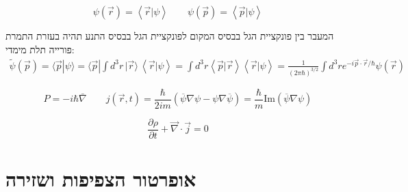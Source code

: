 \documentclass{tstextbook}
\begin{document}
\begin{definition}
$$\psi\left(\vec{r}\right)=\left\langle \vec{r}|\psi \right\rangle  \qquad \psi\left( \vec{p} \right)=\left\langle  \vec{p}|\psi  \right\rangle $$

\end{definition}
\begin{proposition}
המעבר בין פונקציית הגל בבסיס המקום לפונקציית הגל בבסיס התנע תהיה בעזרת התמרת פורייה תלת מימדי:
\begin{gather*}\widetilde{\psi}\left({\vec p}\right)=\langle {\vec p}|\psi \rangle=\langle {\vec p}|\int d^{3}r\,|{\vec r} \rangle\,\left\langle {\vec r}|\psi \right\rangle =\int d^{3}r\left\langle\vec{p}|\vec{r}\right\rangle\left\langle\vec{r}|\psi\right\rangle={\frac{1}{(2\pi\hbar)^{3/2}}}\int d^{3}r e^{-i\vec{p}\cdot\vec{r}/\hbar}\psi\left(\vec{r}\right)
\end{gather*}

\end{proposition}
\begin{definition}
$$P=-i\hbar \bar{\nabla} \qquad j\left( \vec{r},t \right)={\frac{\hbar}{2i m}}\left(\overline{{{\psi}}}\nabla\psi-\psi\nabla\overline{{{\psi}}}\right)={\frac{\hbar}{m}}\mathrm{Im}\left(\overline{{{\psi}}}\nabla\psi\right)$$

\end{definition}
\begin{proposition}
$${\frac{\partial\rho}{\partial t}}+{\vec{\nabla}}\cdot\vec{j}=0$$

\end{proposition}
\section{אופרטור הצפיפות ושזירה}
\end{document}
